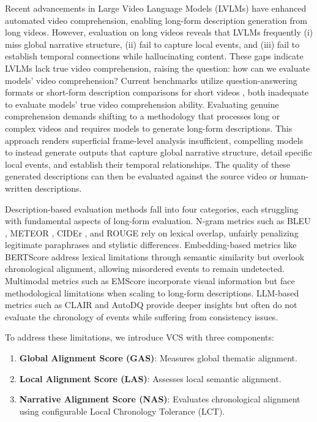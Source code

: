 \documentclass[letterpaper]{article} %
\begin{document}
Recent advancements in Large Video Language Models (LVLMs) \citep{Yuan2025Tarsier2,Shen2025LongVU,Ataallah2024Goldfish,Chen2025LongVILA} have enhanced automated video comprehension, enabling long-form description generation from long videos. However, evaluation on long videos reveals that LVLMs frequently (i) miss global narrative structure, (ii) fail to capture local events, and (iii) fail to establish temporal connections while hallucinating content. These gaps indicate LVLMs lack true video comprehension, raising the question: how can we evaluate models' video comprehension? Current benchmarks utilize question-answering formats \citep{wu2024longvideobench,ataallah2024infinibench,nagrani2025neptune} or short-form description comparisons for short videos \citep{wyzs:24,chen:acl11,ZhXuCoAAAI18}, both inadequate to evaluate models' true video comprehension ability. Evaluating genuine comprehension demands shifting to a methodology that processes long or complex videos and requires models to generate long-form descriptions. This approach renders superficial frame-level analysis insufficient, compelling models to instead generate outputs that capture global narrative structure, detail specific local events, and establish their temporal relationships. The quality of these generated descriptions can then be evaluated against the source video or human-written descriptions.

Description-based evaluation methods fall into four categories, each struggling with fundamental aspects of long-form evaluation. N-gram metrics such as BLEU \citep{p:02}, METEOR \citep{bl:05}, CIDEr \citep{v:15}, and ROUGE \citep{l:04} rely on lexical overlap, unfairly penalizing legitimate paraphrases and stylistic differences. Embedding-based metrics like BERTScore \citep{z:20} address lexical limitations through semantic similarity but overlook chronological alignment, allowing misordered events to remain undetected. Multimodal metrics such as EMScore \citep{syxl:22} incorporate visual information but face methodological limitations when scaling to long-form descriptions. LLM-based metrics such as CLAIR \citep{chan:23} and AutoDQ \citep{wyzs:24} provide deeper insights but often do not evaluate the chronology of events while suffering from consistency issues.

To address these limitations, we introduce VCS with three components:
\begin{enumerate}
\item \textbf{Global Alignment Score (GAS)}: Measures global thematic alignment.
\item \textbf{Local Alignment Score (LAS)}: Assesses local semantic alignment.
\item \textbf{Narrative Alignment Score (NAS)}: Evaluates chronological alignment using configurable Local Chronology Tolerance (LCT).
\end{enumerate}
\end{document}
